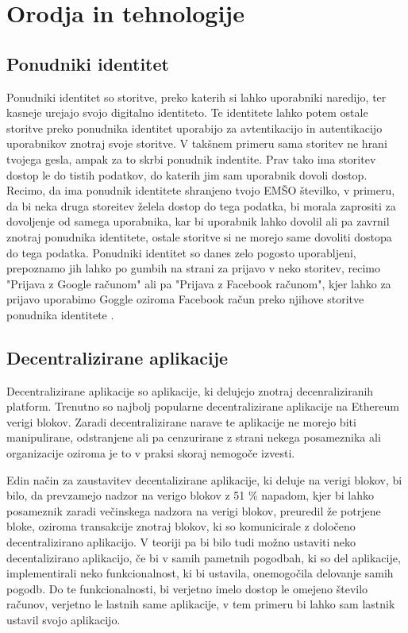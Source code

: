 \documentclass[a4paper,12pt,openright]{book}
\begin{document}
\chapter{Orodja in tehnologije}

\section{Ponudniki identitet}
Ponudniki identitet so storitve, preko katerih si lahko uporabniki naredijo, ter kasneje urejajo svojo digitalno identiteto.
Te identitete lahko potem ostale storitve preko ponudnika identitet uporabijo za avtentikacijo in autentikacijo uporabnikov znotraj svoje storitve.
V takšnem primeru sama storitev ne hrani tvojega gesla, ampak za to skrbi ponudnik indentite.
Prav tako ima storitev dostop le do tistih podatkov, do katerih jim sam uporabnik dovoli dostop.
Recimo, da ima ponudnik identitete shranjeno tvojo EMŠO številko, v primeru, da bi neka druga storeitev želela dostop do tega podatka,
bi morala zaprositi za dovoljenje od samega uporabnika, kar bi uporabnik lahko dovolil ali pa zavrnil znotraj ponudnika identitete,
ostale storitve si ne morejo same dovoliti dostopa do tega podatka.
Ponudniki identitet so danes zelo pogosto uporabljeni, prepoznamo jih lahko po gumbih na strani za prijavo v neko storitev, 
recimo "Prijava z Google računom" ali pa "Prijava z Facebook računom", kjer lahko za prijavo uporabimo Goggle oziroma 
Facebook račun preko njihove storitve ponudnika identitete \cite{identity_provider_ubisecure}.

\section{Decentralizirane aplikacije}
Decentralizirane aplikacije so aplikacije, ki delujejo znotraj decenraliziranih platform.
Trenutno so najbolj popularne decentralizirane aplikacije na Ethereum verigi blokov.
Zaradi decentralizirane narave te aplikacije ne morejo biti manipulirane, odstranjene ali pa cenzurirane z strani 
nekega posameznika ali organizacije oziroma je to v praksi skoraj nemogoče izvesti.

Edin način za zaustavitev decentalizirane aplikacije, ki deluje na verigi blokov, bi bilo, da prevzamejo nadzor na verigo blokov z 51 \% napadom, 
kjer bi lahko posameznik zaradi večinskega nadzora na verigi blokov, preuredil že potrjene bloke, oziroma transakcije znotraj blokov, ki so 
komunicirale z določeno decentralizirano aplikacijo. 
V teoriji pa bi bilo tudi možno ustaviti neko decentalizirano aplikacijo, če bi v samih pametnih pogodbah, ki so del aplikacije, implementirali
neko funkcionalnost, ki bi ustavila, onemogočila delovanje samih pogodb.
Do te funkcionalnosti, bi verjetno imelo dostop le omejeno število računov, verjetno le lastnih same aplikacije, 
v tem primeru bi lahko sam lastnik ustavil svojo aplikacijo.
\end{document}
